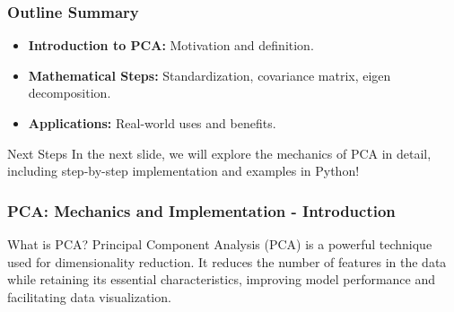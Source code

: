 \documentclass[aspectratio=169]{beamer}
\begin{document}
\begin{frame}[fragile]
    \frametitle{Outline Summary}
    \begin{itemize}
        \item \textbf{Introduction to PCA:} Motivation and definition.
        \item \textbf{Mathematical Steps:} Standardization, covariance matrix, eigen decomposition.
        \item \textbf{Applications:} Real-world uses and benefits.
    \end{itemize}
    
    \begin{block}{Next Steps}
        In the next slide, we will explore the mechanics of PCA in detail, including step-by-step implementation and examples in Python!
    \end{block}
\end{frame}

\begin{frame}[fragile]
    \frametitle{PCA: Mechanics and Implementation - Introduction}
    \begin{block}{What is PCA?}
        Principal Component Analysis (PCA) is a powerful technique used for dimensionality reduction.
        It reduces the number of features in the data while retaining its essential characteristics, improving model performance and facilitating data visualization.
    \end{block}
\end{frame}
\end{document}

